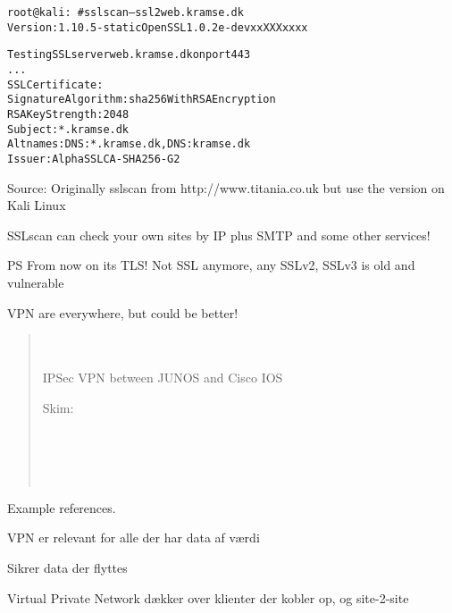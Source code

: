 \documentclass[Screen16to9,17pt]{foils}
\begin{document}

\begin{alltt}\small
root@kali:~# sslscan --ssl2 web.kramse.dk
Version: 1.10.5-static OpenSSL 1.0.2e-dev xx XXX xxxx

Testing SSL server web.kramse.dk on port 443
...
  SSL Certificate:
Signature Algorithm: sha256WithRSAEncryption
RSA Key Strength:    2048
Subject:  *.kramse.dk
Altnames: DNS:*.kramse.dk, DNS:kramse.dk
Issuer:   AlphaSSL CA - SHA256 - G2
\end{alltt}

Source:
Originally sslscan from http://www.titania.co.uk
 but use the version on Kali Linux

SSLscan can check your own sites by IP plus SMTP and some other services!

\vskip 1cm
PS From now on its TLS! Not SSL anymore, any SSLv2, SSLv3 is old and vulnerable



VPN are everywhere, but could be better!

\begin{quote}
\\
\\
IPSec VPN between JUNOS and Cisco IOS

Skim:\\
\\
\\
\\
\\
\end{quote}

Example references.



\begin{list2}
\item VPN er relevant for alle der har data af værdi
\item Sikrer data der flyttes
\item Virtual Private Network dækker over klienter der kobler op, og site-2-site
\end{list2}
\end{document}
